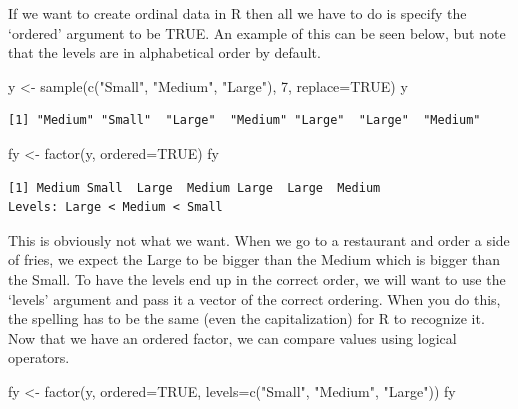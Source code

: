 \documentclass[
  letterpaper,
  DIV=11,
  numbers=noendperiod]{scrreprt}
\newenvironment{Shaded}{\begin{snugshade}}{\end{snugshade}}
\newcommand{\AttributeTok}[1]{\textcolor[rgb]{0.40,0.45,0.13}{#1}}
\newcommand{\ConstantTok}[1]{\textcolor[rgb]{0.56,0.35,0.01}{#1}}
\newcommand{\DecValTok}[1]{\textcolor[rgb]{0.68,0.00,0.00}{#1}}
\newcommand{\FunctionTok}[1]{\textcolor[rgb]{0.28,0.35,0.67}{#1}}
\newcommand{\NormalTok}[1]{\textcolor[rgb]{0.00,0.23,0.31}{#1}}
\newcommand{\OtherTok}[1]{\textcolor[rgb]{0.00,0.23,0.31}{#1}}
\newcommand{\StringTok}[1]{\textcolor[rgb]{0.13,0.47,0.30}{#1}}
\begin{document}
If we want to create ordinal data in R then all we have to do is specify
the `ordered' argument to be TRUE. An example of this can be seen below,
but note that the levels are in alphabetical order by default.

\begin{Shaded}
\begin{Highlighting}[]
\NormalTok{y }\OtherTok{\textless{}{-}} \FunctionTok{sample}\NormalTok{(}\FunctionTok{c}\NormalTok{(}\StringTok{"Small"}\NormalTok{, }\StringTok{"Medium"}\NormalTok{, }\StringTok{"Large"}\NormalTok{), }\DecValTok{7}\NormalTok{, }\AttributeTok{replace=}\ConstantTok{TRUE}\NormalTok{)}
\NormalTok{y}
\end{Highlighting}
\end{Shaded}

\begin{verbatim}
[1] "Medium" "Small"  "Large"  "Medium" "Large"  "Large"  "Medium"
\end{verbatim}

\begin{Shaded}
\begin{Highlighting}[]
\NormalTok{fy }\OtherTok{\textless{}{-}} \FunctionTok{factor}\NormalTok{(y, }\AttributeTok{ordered=}\ConstantTok{TRUE}\NormalTok{)}
\NormalTok{fy}
\end{Highlighting}
\end{Shaded}

\begin{verbatim}
[1] Medium Small  Large  Medium Large  Large  Medium
Levels: Large < Medium < Small
\end{verbatim}

This is obviously not what we want. When we go to a restaurant and order
a side of fries, we expect the Large to be bigger than the Medium which
is bigger than the Small. To have the levels end up in the correct
order, we will want to use the `levels' argument and pass it a vector of
the correct ordering. When you do this, the spelling has to be the same
(even the capitalization) for R to recognize it. Now that we have an
ordered factor, we can compare values using logical operators.

\begin{Shaded}
\begin{Highlighting}[]
\NormalTok{fy }\OtherTok{\textless{}{-}} \FunctionTok{factor}\NormalTok{(y, }\AttributeTok{ordered=}\ConstantTok{TRUE}\NormalTok{, }\AttributeTok{levels=}\FunctionTok{c}\NormalTok{(}\StringTok{"Small"}\NormalTok{, }\StringTok{"Medium"}\NormalTok{, }\StringTok{"Large"}\NormalTok{))}
\NormalTok{fy}
\end{Highlighting}
\end{Shaded}
\end{document}
